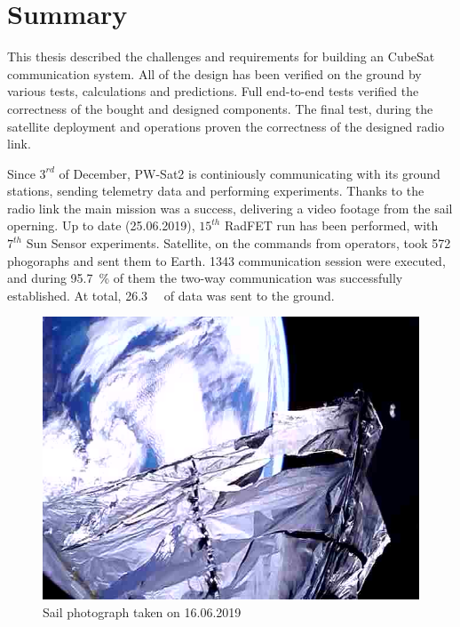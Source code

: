 \section{Summary}
This thesis described the challenges and requirements for building an CubeSat communication system. All of the design has been verified on the ground by various tests, calculations and predictions. Full end-to-end tests verified the correctness of the bought and designed components. The final test, during the satellite deployment and operations proven the correctness of the designed radio link.

Since $3^{rd}$ of December, PW-Sat2 is continiously communicating with its ground stations, sending telemetry data and performing experiments. Thanks to the radio link the main mission was a success, delivering a video footage from the sail operning. Up to date (25.06.2019), $15^{th}$ RadFET run has been performed, with $7^{th}$ Sun Sensor experiments. Satellite, on the commands from operators, took \si{572} phogoraphs and sent them to Earth. \si{1343} communication session were executed, and during \SI{95.7}{\percent} of them the two-way communication was successfully established. At total, \SI{26.3}{\mega\byte} of data was sent to the ground.

\begin{figure}[H]
    \centering
    \includegraphics[width=0.65\paperwidth]{img/9/sail_photo.jpg}
    \caption{Sail photograph taken on 16.06.2019}
    \label{sail_photo}
\end{figure}